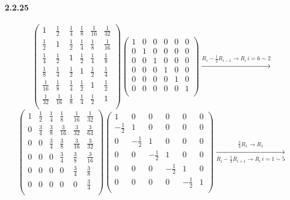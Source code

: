 \documentclass[a4paper]{article}
\begin{document}
\paragraph{2.2.25}
\renewcommand{\arraystretch}{1.5}
\[
\begin{pmatrix}
1&\frac{1}{2}&\frac{1}{4}&\frac{1}{8}&\frac{1}{16}&\frac{1}{32}\\
\frac{1}{2}&1&\frac{1}{2}&\frac{1}{4}&\frac{1}{8}&\frac{1}{16
}\\
\frac{1}{4}&\frac{1}{2}&1&\frac{1}{2}&\frac{1}{4}&\frac{1}{8}\\
\frac{1}{8}&\frac{1}{4}&\frac{1}{2}&1&\frac{1}{2}&\frac{1}{4}\\
\frac{1}{16}&\frac{1}{8}&\frac{1}{4}&\frac{1}{2}&1&\frac{1}{2}\\
\frac{1}{32}&\frac{1}{16}&\frac{1}{8}&\frac{1}{4}&\frac{1}{2}&1\\
\end{pmatrix}
\begin{pmatrix}
1&0&0&0&0&0\\
0&1&0&0&0&0\\
0&0&1&0&0&0\\
0&0&0&1&0&0\\
0&0&0&0&1&0\\
0&0&0&0&0&1\\
\end{pmatrix}
\xrightarrow{R_i-\frac{1}{2}R_{i-1}\rightarrow R_i \,i=6\sim2}
\]
\[
\begin{pmatrix}
1&\frac{1}{2}&\frac{1}{4}&\frac{1}{8}&\frac{1}{16}&\frac{1}{32}\\
0&\frac{3}{4}&\frac{3}{8}&\frac{3}{16}&\frac{3}{32}&\frac{3}{64}\\
0&0&\frac{3}{4}&\frac{3}{8}&\frac{3}{16}&\frac{3}{32}\\
0&0&0&\frac{3}{4}&\frac{3}{8}&\frac{3}{16}\\
0&0&0&0&\frac{3}{4}&\frac{3}{8}\\
0&0&0&0&0&\frac{3}{4}\\
\end{pmatrix}
\begin{pmatrix}
1&0&0&0&0&0\\
-\frac{1}{2}&1&0&0&0&0\\
0&-\frac{1}{2}&1&0&0&0\\
0&0&-\frac{1}{2}&1&0&0\\
0&0&0&-\frac{1}{2}&1&0\\
0&0&0&0&-\frac{1}{2}&1\\
\end{pmatrix}
\xrightarrow[R_i-\frac{1}{2}R_{i+1}\rightarrow R_i \,i=1\sim5]{\frac{3}{4}R_1\rightarrow R_1}
\]
\end{document}
